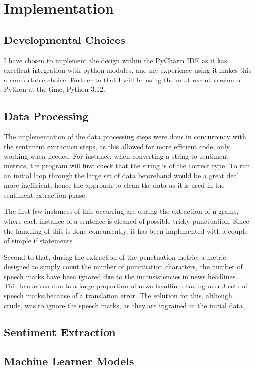 \documentclass[11pt, a4paper]{article}
\begin{document}
\section{Implementation}
\subsection{Developmental Choices}
I have chosen to implement the design within the PyCharm IDE as it has excellent integration with python modules, and my experience using it makes this a comfortable choice. Further to that I will be using the most recent version of Python at the time, Python 3.12.

\subsection{Data Processing}
The implementation of the data processing steps were done in concurrency with the sentiment extraction steps, as this allowed for more efficient code, only working when needed. For instance, when converting a string to sentiment metrics, the program will first check that the string is of the correct type. To run an initial loop through the large set of data beforehand would be a great deal more inefficient, hence the approach to clean the data as it is used in the sentiment extraction phase.

The first few instances of this occurring are during the extraction of n-grams, where each instance of a sentence is cleaned of possible tricky punctuation. Since the handling of this is done concurrently, it has been implemented with a couple of simple if statements.

Second to that, during the extraction of the punctuation metric, a metric designed to simply count the number of punctuation characters, the number of speech marks have been ignored due to the inconsistencies in news headlines. This has arisen due to a large proportion of news headlines having over 3 sets of speech marks because of a translation error. The solution for this, although crude, was to ignore the speech marks, as they are ingrained in the initial data. 
\subsection{Sentiment Extraction}

\subsection{Machine Learner Models}
\end{document}
